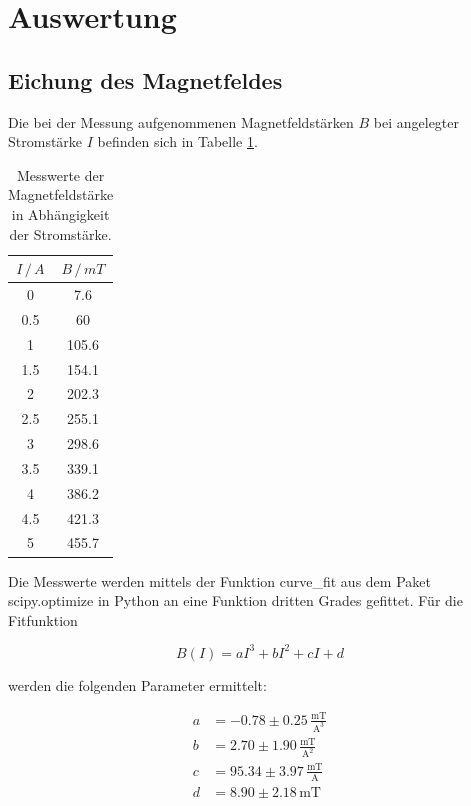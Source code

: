 \newpage
\section{Auswertung}
\label{sec:Auswertung}
\subsection{Eichung des Magnetfeldes}
\label{sec:eich}
Die bei der Messung aufgenommenen Magnetfeldstärken $B$ bei angelegter Stromstärke $I$ befinden sich in Tabelle \ref{tab:bfeld}.

\begin{table}
    \centering
    \begin{tabular}{c c}
    \toprule
    $I \,/\,A$ & $B \,/\, mT$ \\
     \midrule 
  0  & 7.6  \\
  0.5  & 60  \\
  1  & 105.6   \\
  1.5  & 154.1  \\
  2  & 202.3   \\
  2.5  & 255.1  \\
  3  & 298.6   \\
  3.5  & 339.1  \\
  4  &  386.2   \\
  4.5  &  421.3 \\
  5  & 455.7 \\
    \bottomrule
    \end{tabular}
    \caption{Messwerte der Magnetfeldstärke in Abhängigkeit der Stromstärke.}
    \label{tab:bfeld}
    \end{table}


\noindent
Die Messwerte werden mittels der Funktion curve\_fit aus dem Paket scipy.optimize in Python an eine Funktion dritten Grades gefittet.
Für die Fitfunktion

\begin{equation*}
    B(I)=aI^3 + bI^2 + cI + d
\end{equation*}

\noindent
werden die folgenden Parameter ermittelt:

\begin{align*}
    a&=-0.78 \pm 0.25 \, \frac{\text{mT}}{\text{A}^3} \\
    b&=2.70  \pm 1.90 \, \frac{\text{mT}}{\text{A}^2} \\
    c&=95.34 \pm 3.97 \, \frac{\text{mT}}{\text{A}} \\
    d&=8.90  \pm 2.18 \, \text{mT} \\
\end{align*}

